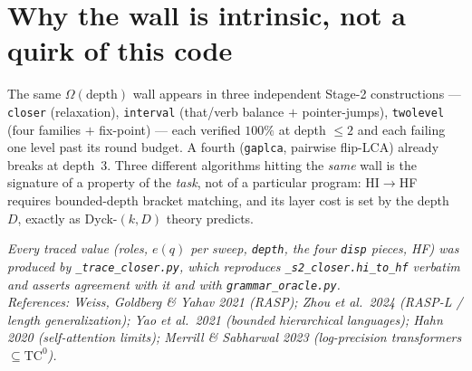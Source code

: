 \documentclass[11pt]{article}
\newcommand{\code}[1]{\texttt{#1}}
\begin{document}
\section{Why the wall is intrinsic, not a quirk of this code}
The same $\Omega(\text{depth})$ wall appears in three independent Stage-2 constructions ---
\texttt{closer} (relaxation), \texttt{interval} (that/verb balance $+$ pointer-jumps),
\texttt{twolevel} (four families $+$ fix-point) --- each verified $100\%$ at depth $\le 2$ and each
failing one level past its round budget. A fourth (\texttt{gaplca}, pairwise flip-LCA) already
breaks at depth~3. Three different algorithms hitting the \emph{same} wall is the signature of a
property of the \emph{task}, not of a particular program: HI$\to$HF requires bounded-depth bracket
matching, and its layer cost is set by the depth $D$, exactly as Dyck-$(k,D)$ theory predicts.

\vfill
\begin{center}\footnotesize\itshape
Every traced value (roles, $e(q)$ per sweep, \code{depth}, the four \code{disp} pieces, HF) was
produced by \texttt{\_trace\_closer.py}, which reproduces \texttt{\_s2\_closer.hi\_to\_hf} verbatim
and asserts agreement with it and with \texttt{grammar\_oracle.py}.\\[2pt]
References: Weiss, Goldberg \& Yahav 2021 (RASP); Zhou et al.\ 2024 (RASP-L / length generalization);
Yao et al.\ 2021 (bounded hierarchical languages); Hahn 2020 (self-attention limits);
Merrill \& Sabharwal 2023 (log-precision transformers $\subseteq \mathrm{TC}^0$).
\end{center}
\end{document}
